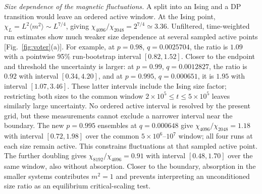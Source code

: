 \textit{Size dependence of the magnetic fluctuations.} A split into an Ising
and a DP transition would leave an ordered active window. At the Ising point,
$\chi_L=L^2\langle m^2\rangle\sim L^{7/4}$, giving
$\chi_{4096}/\chi_{2048}=2^{7/4}\simeq3.36$.
Unfiltered, time-weighted run estimates show much weaker size dependence
at several sampled active points [Fig.~\ref{fig:voter}(a)]. For example,
at $p=0.98$, $q=0.0025704$, the ratio is $1.09$ with a pointwise
95\% run-bootstrap interval $[0.82,1.52]$.
Closer to the endpoint and threshold the uncertainty is larger:
at $p=0.99$, $q=0.0012827$, the ratio is $0.92$ with interval
$[0.34,4.20]$, and at $p=0.995$, $q=0.000651$, it is $1.95$
with interval $[1.07,3.46]$. These latter intervals include the Ising
size factor; restricting both sizes to the common window
$2\times10^5\le t\le5\times10^5$ leaves similarly large uncertainty.
No ordered active interval is resolved by the present grid,
but these measurements cannot exclude a narrower interval near the boundary.
The new $p=0.995$ ensembles at $q=0.000648$ give
$\chi_{4096}/\chi_{2048}=1.18$ with interval $[0.72,1.98]$ over the
common $5\times10^6$--$10^7$ window; all four runs at each size remain
active. This constrains fluctuations at that sampled active point.
The further doubling gives $\chi_{8192}/\chi_{4096}=0.91$ with interval
$[0.48,1.70]$ over the same window, also without absorption.
Closer to the boundary, absorption in the smaller systems contributes
$m^2=1$ and prevents interpreting an unconditioned size ratio as an
equilibrium critical-scaling test.

